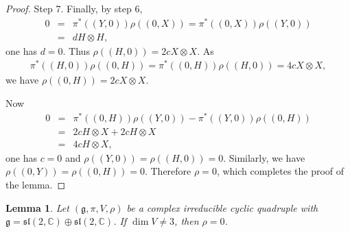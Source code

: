 \documentclass[reqno]{amsart}
\newtheorem{lem}[thm]{Lemma}
\theoremstyle{definition}
\begin{document}
\begin{proof}
Step 7. Finally, by step 6,
\begin{eqnarray*}
0 &=& \pi^{\ast}((Y,0))\rho((0,X))=\pi^{\ast}((0,X))\rho((Y,0))\\
  &=& d H\otimes H,
\end{eqnarray*}
one has $d=0$. Thus $\rho((H,0))=2c X\otimes X$. As
\begin{eqnarray*}
\pi^{\ast}((H,0))\rho((0,H))=\pi^{\ast}((0,H))\rho((H,0))=4cX\otimes X,
\end{eqnarray*}
we have $\rho((0,H))=2cX\otimes X$.

Now
\begin{eqnarray*}
0 &=& \pi^{\ast}((0,H))\rho((Y,0))-\pi^{\ast}((Y,0))\rho((0,H))\\
  &=& 2cH\otimes X+2cH\otimes X\\
  &=& 4cH\otimes X,
\end{eqnarray*}
one has $c=0$ and $\rho((Y,0))=\rho((H,0))=0$. Similarly, we have $\rho((0,Y))=\rho((0,H))=0$.
Therefore $\rho=0$, which completes the proof of the lemma.
\end{proof}
\begin{lem}\label{5.2-lem3}
Let $(\mathfrak{g},\pi,V,\rho)$ be a complex irreducible cyclic quadruple with $\mathfrak{g}=\mathfrak{sl}(2,\mathbb{C})\oplus\mathfrak{sl}(2,\mathbb{C})$.
If $\dim V\neq 3$, then $\rho=0$.
\end{lem}
\end{document}
